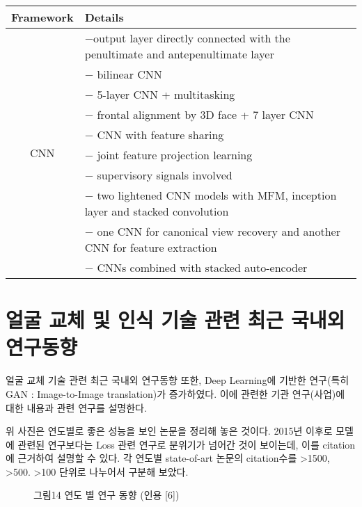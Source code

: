 \documentclass{oblivoir}
\begin{document}
\begin{table}[h!]
    \centering
        \begin{tabular}{|c|l|}
            \hline
            \rowcolor{lightgray} Framework &  Details \\ \hline
            \multirow{10}{5cm}{\centering CNN}
            &   $-$output layer directly connected with the penultimate and antepenultimate layer \\
            &   $-$ bilinear CNN \\
            &   $-$ 5-layer CNN + multitasking  \\
            &   $-$ frontal alignment by 3D face +  7 layer CNN \\
            &   $-$ CNN with feature sharing  \\
            &   $-$ joint feature projection learning  \\
            &   $-$ supervisory signals involved  \\
            &   $-$ two lightened CNN models with MFM, inception layer and stacked convolution \\
            &   $-$ one CNN for canonical view recovery and another CNN for feature extraction  \\
            &   $-$ CNNs combined with stacked auto-encoder \\
            \hline        
        \end{tabular}
\end{table}

\section{얼굴 교체 및 인식 기술 관련 최근 국내외 연구동향}

얼굴 교체 기술 관련 최근 국내외 연구동향 또한, Deep Learning에 기반한 연구(특히 GAN : Image-to-Image translation)가 증가하였다. 이에 관련한 기관 연구(사업)에 대한 내용과 관련 연구를 설명한다.


위 사진은 연도별로 좋은 성능을 보인 논문을 정리해 놓은 것이다. 2015년 이후로 모델에 관련된 연구보다는 Loss 관련 연구로 분위기가 넘어간 것이 보이는데, 이를 citation에 근거하여 설명할 수 있다. 각 연도별 state-of-art 논문의 citation수를 >1500, >500. >100 단위로 나누어서 구분해 보았다. 

\begin{figure}[h!]
    \centering
    \caption{그림14  연도 별 연구 동향 (인용 [6])}
\end{figure}
\end{document}
